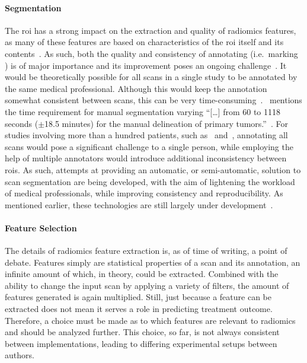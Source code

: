 \paragraph{Segmentation} The \ac{roi} has a strong impact on the extraction and quality of radiomics 
features, as many of these features are based on characteristics of the \ac{roi}
itself and its contents~\cite{py_rad,py_rad_docs}. As such, both the quality and consistency
of annotating (i.e.~marking ) is of major importance and its improvement
poses an ongoing challenge~\cite{radiomics_process_and_challenges,u-net_auto_anno}.
It would be theoretically possible for all scans in a single study to be 
annotated by the same medical professional. Although this would keep the 
annotation somewhat consistent between scans, this can be very time-consuming~\cite{radiomics_process_and_challenges}.~\cite{auto_and_semiauto}
mentions the time requirement for manual segmentation varying \enquote{[\ldots] 
from 60 to 1118 seconds ($\pm$18.5 minutes) for the manual delineation of 
primary tumors.}~\cite[p.~828]{auto_and_semiauto}. For studies involving more 
than a hundred patients, such as~\cite{u-net_auto_anno} and~\cite{dl_rectal_segmentation}, 
annotating all scans would pose a significant
challenge to a single person, while employing the help of multiple annotators 
would introduce additional inconsistency between \acp{roi}. As such, attempts
at providing an automatic, or semi-automatic, solution to scan segmentation are 
being developed, with the aim of lightening the workload of medical 
professionals, while improving consistency and 
reproducibility. As mentioned earlier, these technologies are still largely 
under development~\cite{radiomics_process_and_challenges,auto_and_semiauto,dl_rectal_segmentation}.

\paragraph{Feature Selection} The details of radiomics feature extraction is, as of time of writing, a point
of debate. Features simply are statistical properties of a scan and its 
annotation, an infinite amount of which, in theory, could be extracted. Combined
with the ability to change the input scan by applying a variety of filters, the
amount of features generated is again multiplied. Still, just because a feature 
can be extracted does not mean it serves a role in predicting treatment outcome.
Therefore, a choice must be made as to which features are relevant to radiomics
and should be analyzed further. This choice, so far, is not always consistent 
between implementations, leading to differing experimental setups between 
authors.

